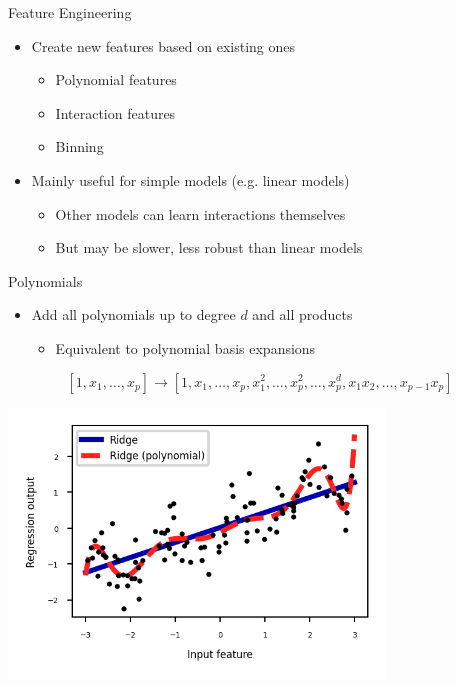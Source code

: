 \begin{frame}{Feature Engineering}

\begin{itemize}
    \item Create new features based on existing ones
    \begin{itemize}
        \item Polynomial features
        \item Interaction features
        \item Binning
    \end{itemize}

    \item Mainly useful for simple models (e.g. linear models)
    \begin{itemize}
        \item Other models can learn interactions themselves
        \item But may be slower, less robust than linear models
    \end{itemize}
\end{itemize}

\end{frame}

\begin{frame}{Polynomials}

\begin{itemize}
    \item Add all polynomials up to degree $d$ and all products
    \begin{itemize}
        \item Equivalent to polynomial basis expansions
    \end{itemize}
\end{itemize}

\[
[1, x_1, \ldots, x_p] \rightarrow [1, x_1, \ldots, x_p, x_1^2, \ldots, x_p^2, \ldots, x_p^d, x_1 x_2, \ldots, x_{p-1} x_p]
\]

\begin{center}
    \includegraphics[width=0.75\textwidth]{images/pre-processing/polynomial.png}
\end{center}

\end{frame}



